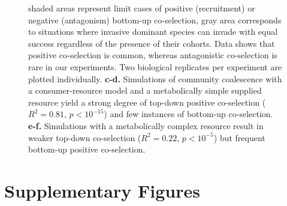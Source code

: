 \documentclass[a4paper,10pt]{article}
\begin{document}
\begin{figure}[!h]
{shaded areas represent limit cases of positive (recruitment) or negative (antagonism)
bottom-up co-selection, gray area corresponds to situations where invasive dominant
species can invade with equal success regardless of the presence of their cohorts.
Data shows that positive co-selection is common, whereas antagonistic
co-selection is rare in our experiments.
Two biological replicates per experiment are plotted individually.
\textbf{c-d.} Simulations of community coalescence with a consumer-resource model
and a metabolically simple supplied resource yield a strong degree of top-down positive
co-selection
($R^2=0.81$, $p<10^{-15}$)
and few instances of bottom-up co-selection.
\textbf{e-f.} Simulations with a metabolically complex resource result in weaker
top-down co-selection
($R^2=0.22$, $p<10^{-5}$)
but frequent bottom-up positive co-selection.}
\label{fig2}
\end{figure}

\clearpage

\section*{Supplementary Figures}

\renewcommand{\thefigure}{S\arabic{figure}}
\setcounter{figure}{0} 
\end{document}
